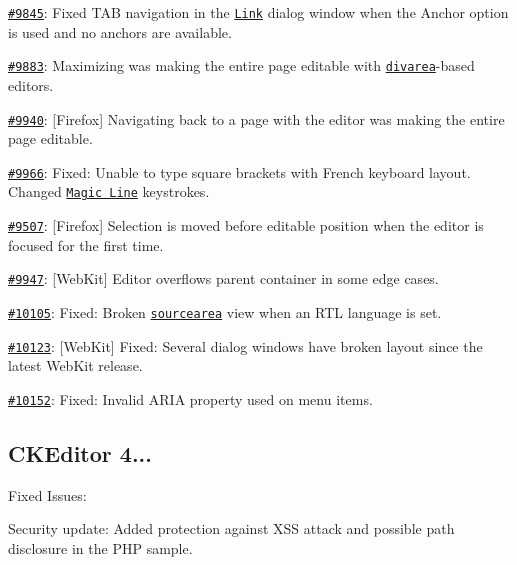 \begin{DoxyItemize}
\item \href{http://dev.ckeditor.com/ticket/9845}{\tt \#9845}\-: Fixed T\-A\-B navigation in the \href{http://ckeditor.com/addon/link}{\tt Link} dialog window when the Anchor option is used and no anchors are available.
\item \href{http://dev.ckeditor.com/ticket/9883}{\tt \#9883}\-: Maximizing was making the entire page editable with \href{http://ckeditor.com/addon/divarea}{\tt divarea}-\/based editors.
\item \href{http://dev.ckeditor.com/ticket/9940}{\tt \#9940}\-: \mbox{[}Firefox\mbox{]} Navigating back to a page with the editor was making the entire page editable.
\item \href{http://dev.ckeditor.com/ticket/9966}{\tt \#9966}\-: Fixed\-: Unable to type square brackets with French keyboard layout. Changed \href{http://ckeditor.com/addon/magicline}{\tt Magic Line} keystrokes.
\item \href{http://dev.ckeditor.com/ticket/9507}{\tt \#9507}\-: \mbox{[}Firefox\mbox{]} Selection is moved before editable position when the editor is focused for the first time.
\item \href{http://dev.ckeditor.com/ticket/9947}{\tt \#9947}\-: \mbox{[}Web\-Kit\mbox{]} Editor overflows parent container in some edge cases.
\item \href{http://dev.ckeditor.com/ticket/10105}{\tt \#10105}\-: Fixed\-: Broken \href{http://ckeditor.com/addon/sourcearea}{\tt sourcearea} view when an R\-T\-L language is set.
\item \href{http://dev.ckeditor.com/ticket/10123}{\tt \#10123}\-: \mbox{[}Web\-Kit\mbox{]} Fixed\-: Several dialog windows have broken layout since the latest Web\-Kit release.
\item \href{http://dev.ckeditor.com/ticket/10152}{\tt \#10152}\-: Fixed\-: Invalid A\-R\-I\-A property used on menu items.
\end{DoxyItemize}

\subsection*{C\-K\-Editor 4...}

Fixed Issues\-:
\begin{DoxyItemize}
\item Security update\-: Added protection against X\-S\-S attack and possible path disclosure in the P\-H\-P sample.
\end{DoxyItemize}

